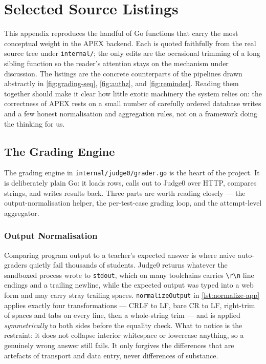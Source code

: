 \chapter{Selected Source Listings}\label{ch:ap-d}

This appendix reproduces the handful of Go functions that carry the most conceptual weight in the APEX backend. Each is quoted faithfully from the real source tree under \texttt{internal/}; the only edits are the occasional trimming of a long sibling function so the reader's attention stays on the mechanism under discussion. The listings are the concrete counterparts of the pipelines drawn abstractly in \cref{fig:grading-seq}, \cref{fig:authz}, and \cref{fig:reminder}. Reading them together should make it clear how little exotic machinery the system relies on: the correctness of APEX rests on a small number of carefully ordered database writes and a few honest normalisation and aggregation rules, not on a framework doing the thinking for us.

\section{The Grading Engine}\label{sec:ap-d-grader}

The grading engine in \texttt{internal/judge0/grader.go} is the heart of the project. It is deliberately plain Go: it loads rows, calls out to Judge0 over HTTP, compares strings, and writes results back. Three parts are worth reading closely --- the output-normalisation helper, the per-test-case grading loop, and the attempt-level aggregator.

\subsection{Output Normalisation}\label{sec:ap-d-normalize}

Comparing program output to a teacher's expected answer is where naive auto-graders quietly fail thousands of students. Judge0 returns whatever the sandboxed process wrote to \texttt{stdout}, which on many toolchains carries \texttt{\textbackslash r\textbackslash n} line endings and a trailing newline, while the expected output was typed into a web form and may carry stray trailing spaces. \texttt{normalizeOutput} in \cref{lst:normalize-app} applies exactly four transformations --- CRLF to LF, bare CR to LF, right-trim of spaces and tabs on every line, then a whole-string trim --- and is applied \emph{symmetrically} to both sides before the equality check. What to notice is the restraint: it does not collapse interior whitespace or lowercase anything, so a genuinely wrong answer still fails. It only forgives the differences that are artefacts of transport and data entry, never differences of substance.

